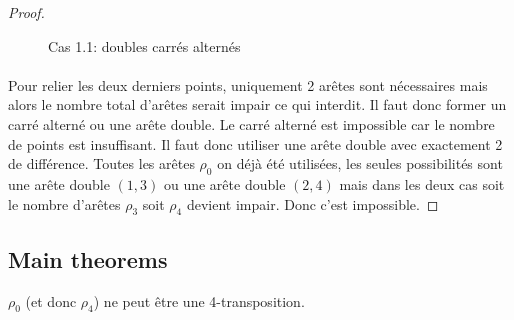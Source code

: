 \begin{proof}
\begin{figure}[H]
\begin{center}
\begin{tikzpicture}
      \end{tikzpicture}
      \caption{Cas 1.1: doubles carrés alternés}
    \end{center}
  \end{figure}

  \paragraph{}
  Pour relier les deux derniers points, uniquement 2 arêtes sont nécessaires mais alors le nombre total d'arêtes serait impair ce qui interdit. Il faut donc former un carré alterné ou une arête double. Le carré alterné est impossible car le nombre de points est insuffisant. Il faut donc utiliser une arête double avec exactement 2 de différence. Toutes les arêtes $\rho_0$ on déjà été utilisées, les seules possibilités sont une arête double $(1,3)$ ou une arête double $(2,4)$ mais dans les deux cas soit le nombre d'arêtes $\rho_3$ soit $\rho_4$ devient impair. Donc c'est impossible.
\end{proof}

\subsection{Main theorems}

\begin{lemma}
  $\rho_0$ (et donc $\rho_4$) ne peut être une 4-transposition.
\end{lemma}

